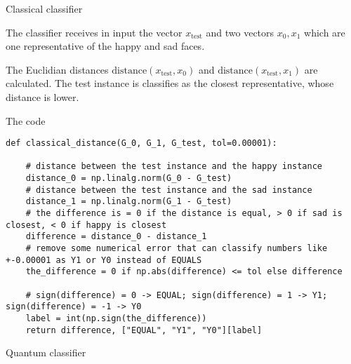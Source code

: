 \begin{frame}{Classical classifier}

The classifier receives in input the vector $x_\text{test}$ and two vectors $x_0, x_1$ which are one representative of the happy and sad faces.

\bigskip The Euclidian distances $\mathrm{distance}(x_\text{test}, x_0)$ and $\mathrm{distance}(x_\text{test}, x_1)$ are calculated. The test instance is classifies as the closest representative, whose distance is lower. 

\end{frame}

\begin{frame}[fragile]{The code}

\begin{verbatim}
def classical_distance(G_0, G_1, G_test, tol=0.00001):
    
    # distance between the test instance and the happy instance
    distance_0 = np.linalg.norm(G_0 - G_test)
    # distance between the test instance and the sad instance
    distance_1 = np.linalg.norm(G_1 - G_test)
    # the difference is = 0 if the distance is equal, > 0 if sad is closest, < 0 if happy is closest
    difference = distance_0 - distance_1
    # remove some numerical error that can classify numbers like +-0.00001 as Y1 or Y0 instead of EQUALS
    the_difference = 0 if np.abs(difference) <= tol else difference
    
    # sign(difference) = 0 -> EQUAL; sign(difference) = 1 -> Y1; sign(difference) = -1 -> Y0
    label = int(np.sign(the_difference))
    return difference, ["EQUAL", "Y1", "Y0"][label]
\end{verbatim}
\end{frame}



\begin{frame}{Quantum classifier}
    \begin{center}
        \scalebox{0.8}{}
    \end{center}
\end{frame}

